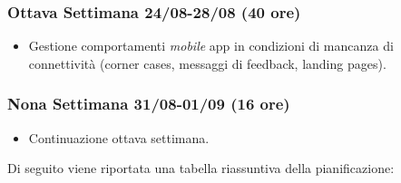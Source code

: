 \begin{trivlist}
\item \subsubsection{Ottava Settimana 24/08-28/08 (40 ore)}
\begin{itemize}
	\item Gestione comportamenti \emph{mobile} app in condizioni di mancanza di connettività (corner cases, messaggi di feedback, landing pages).
\end{itemize}

\item \subsubsection{Nona Settimana 31/08-01/09 (16 ore)}
\begin{itemize}
	\item Continuazione ottava settimana.
\end{itemize}
\end{trivlist}\clearpage
Di seguito viene riportata una tabella riassuntiva della pianificazione:


